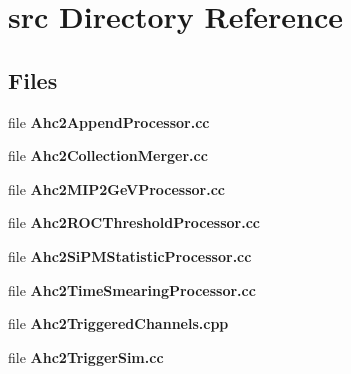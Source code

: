 \section{src Directory Reference}
\label{dir_49dadab6e4ffaf30a0533b661c00937e}
\subsection*{Files}
\begin{DoxyCompactItemize}
\item 
file {\bfseries Ahc2\-Append\-Processor.\-cc}
\item 
file {\bfseries Ahc2\-Collection\-Merger.\-cc}
\item 
file {\bfseries Ahc2\-M\-I\-P2\-Ge\-V\-Processor.\-cc}
\item 
file {\bfseries Ahc2\-R\-O\-C\-Threshold\-Processor.\-cc}
\item 
file {\bfseries Ahc2\-Si\-P\-M\-Statistic\-Processor.\-cc}
\item 
file {\bfseries Ahc2\-Time\-Smearing\-Processor.\-cc}
\item 
file {\bfseries Ahc2\-Triggered\-Channels.\-cpp}
\item 
file {\bfseries Ahc2\-Trigger\-Sim.\-cc}
\end{DoxyCompactItemize}
